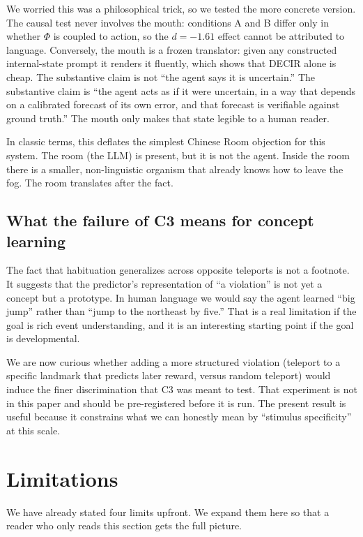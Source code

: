 \documentclass[11pt,a4paper]{article}
\begin{document}
We worried this was a philosophical trick, so we tested the more concrete version. The causal test never involves the mouth: conditions A and B differ only in whether $\Phi$ is coupled to action, so the $d=-1.61$ effect cannot be attributed to language. Conversely, the mouth is a frozen translator: given any constructed internal-state prompt it renders it fluently, which shows that DECIR alone is cheap. The substantive claim is not ``the agent says it is uncertain.'' The substantive claim is ``the agent acts as if it were uncertain, in a way that depends on a calibrated forecast of its own error, and that forecast is verifiable against ground truth.'' The mouth only makes that state legible to a human reader.

In classic terms, this deflates the simplest Chinese Room objection for this system. The room (the LLM) is present, but it is not the agent. Inside the room there is a smaller, non-linguistic organism that already knows how to leave the fog. The room translates after the fact.

\subsection{What the failure of C3 means for concept learning}

The fact that habituation generalizes across opposite teleports is not a footnote. It suggests that the predictor's representation of ``a violation'' is not yet a concept but a prototype. In human language we would say the agent learned ``big jump'' rather than ``jump to the northeast by five.'' That is a real limitation if the goal is rich event understanding, and it is an interesting starting point if the goal is developmental.

We are now curious whether adding a more structured violation (teleport to a specific landmark that predicts later reward, versus random teleport) would induce the finer discrimination that C3 was meant to test. That experiment is not in this paper and should be pre-registered before it is run. The present result is useful because it constrains what we can honestly mean by ``stimulus specificity'' at this scale.

\section{Limitations}
\label{sec:limitations}

We have already stated four limits upfront. We expand them here so that a reader who only reads this section gets the full picture.
\end{document}
